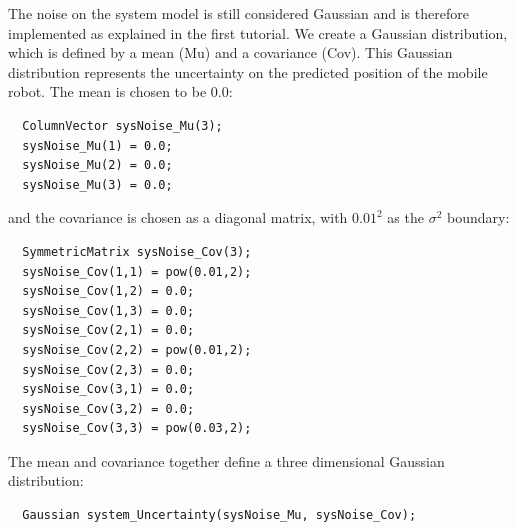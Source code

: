 \documentclass[a4paper,10pt]{report}
\begin{document}
The noise on the system model is still considered Gaussian and is
therefore implemented as explained in the first tutorial. We create a
Gaussian distribution, which is defined by a mean (Mu) and a
covariance (Cov). This Gaussian distribution represents the
uncertainty on the predicted position of the mobile robot. The mean is
chosen to be $0.0$:
\begin{verbatim}
  ColumnVector sysNoise_Mu(3);
  sysNoise_Mu(1) = 0.0;
  sysNoise_Mu(2) = 0.0;
  sysNoise_Mu(3) = 0.0;
\end{verbatim}
and the covariance is chosen as a diagonal matrix, with $0.01^2$ as the
$\sigma^2$ boundary:
\begin{verbatim}
  SymmetricMatrix sysNoise_Cov(3);
  sysNoise_Cov(1,1) = pow(0.01,2);
  sysNoise_Cov(1,2) = 0.0;
  sysNoise_Cov(1,3) = 0.0;
  sysNoise_Cov(2,1) = 0.0;
  sysNoise_Cov(2,2) = pow(0.01,2);
  sysNoise_Cov(2,3) = 0.0;
  sysNoise_Cov(3,1) = 0.0;
  sysNoise_Cov(3,2) = 0.0;
  sysNoise_Cov(3,3) = pow(0.03,2);
\end{verbatim}
The mean and covariance together define a three dimensional Gaussian
distribution:
\begin{verbatim}
  Gaussian system_Uncertainty(sysNoise_Mu, sysNoise_Cov);
\end{verbatim}
\end{document}
